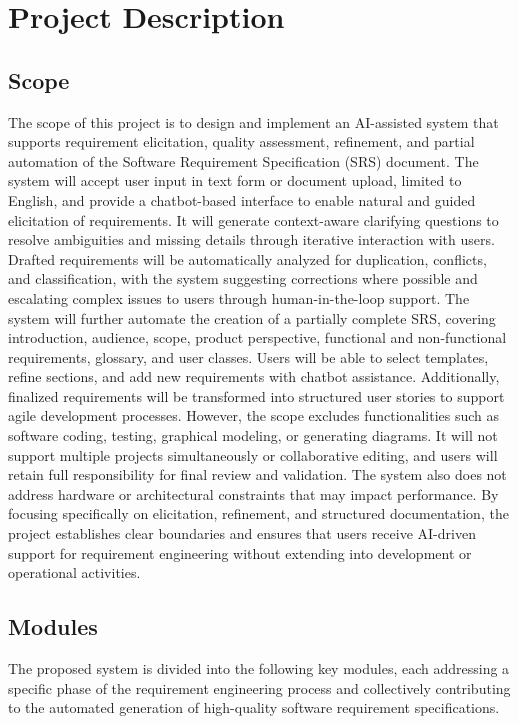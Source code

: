 \chapter{Project Description}
\label{ch:description}
\section{Scope} 
\vspace{-1.18cm} 
The scope of this project is to design and implement an AI-assisted system that supports requirement elicitation, quality assessment, refinement, and partial automation of the Software Requirement Specification (SRS) document. The system will accept user input in text form or document upload, limited to English, and provide a chatbot-based interface to enable natural and guided elicitation of requirements. It will generate context-aware clarifying questions to resolve ambiguities and missing details through iterative interaction with users. Drafted requirements will be automatically analyzed for duplication, conflicts, and classification, with the system suggesting corrections where possible and escalating complex issues to users through human-in-the-loop support. The system will further automate the creation of a partially complete SRS, covering introduction, audience, scope, product perspective, functional and non-functional requirements, glossary, and user classes. Users will be able to select templates, refine sections, and add new requirements with chatbot assistance. Additionally, finalized requirements will be transformed into structured user stories to support agile development processes. However, the scope excludes functionalities such as software coding, testing, graphical modeling, or generating diagrams. It will not support multiple projects simultaneously or collaborative editing, and users will retain full responsibility for final review and validation. The system also does not address hardware or architectural constraints that may impact performance. By focusing specifically on elicitation, refinement, and structured documentation, the project establishes clear boundaries and ensures that users receive AI-driven support for requirement engineering without extending into development or operational activities.

\section{Modules}
The proposed system is divided into the following key modules, each addressing a specific phase of the requirement engineering process and collectively contributing to the automated generation of high-quality software requirement specifications.

